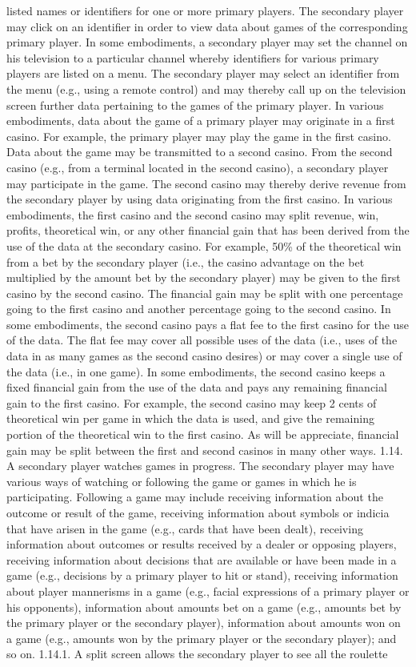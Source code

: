 \documentclass[11pt,a4paper]{article}
\begin{document}
listed names or identifiers for one or more primary players. The secondary player may click on an identifier in order to view data about games of the corresponding primary player. In some embodiments, a secondary player may set the channel on his television to a particular channel whereby identifiers for various primary players are listed on a menu. The secondary player may select an identifier from the menu (e.g., using a remote control) and may thereby call up on the television screen further data pertaining to the games of the primary player. In various embodiments, data about the game of a primary player may originate in a first casino. For example, the primary player may play the game in the first casino. Data about the game may be transmitted to a second casino. From the second casino (e.g., from a terminal located in the second casino), a secondary player may participate in the game. The second casino may thereby derive revenue from the secondary player by using data originating from the first casino. In various embodiments, the first casino and the second casino may split revenue, win, profits, theoretical win, or any other financial gain that has been derived from the use of the data at the secondary casino. For example, 50\% of the theoretical win from a bet by the secondary player (i.e., the casino advantage on the bet multiplied by the amount bet by the secondary player) may be given to the first casino by the second casino. The financial gain may be split with one percentage going to the first casino and another percentage going to the second casino. In some embodiments, the second casino pays a flat fee to the first casino for the use of the data. The flat fee may cover all possible uses of the data (i.e., uses of the data in as many games as the second casino desires) or may cover a single use of the data (i.e., in one game). In some embodiments, the second casino keeps a fixed financial gain from the use of the data and pays any remaining financial gain to the first casino. For example, the second casino may keep 2 cents of theoretical win per game in which the data is used, and give the remaining portion of the theoretical win to the first casino. As will be appreciate, financial gain may be split between the first and second casinos in many other ways. 1.14. A secondary player watches games in progress. The secondary player may have various ways of watching or following the game or games in which he is participating. Following a game may include receiving information about the outcome or result of the game, receiving information about symbols or indicia that have arisen in the game (e.g., cards that have been dealt), receiving information about outcomes or results received by a dealer or opposing players, receiving information about decisions that are available or have been made in a game (e.g., decisions by a primary player to hit or stand), receiving information about player mannerisms in a game (e.g., facial expressions of a primary player or his opponents), information about amounts bet on a game (e.g., amounts bet by the primary player or the secondary player), information about amounts won on a game (e.g., amounts won by the primary player or the secondary player); and so on. 1.14.1. A split screen allows the secondary player to see all the roulette 
\end{document}
